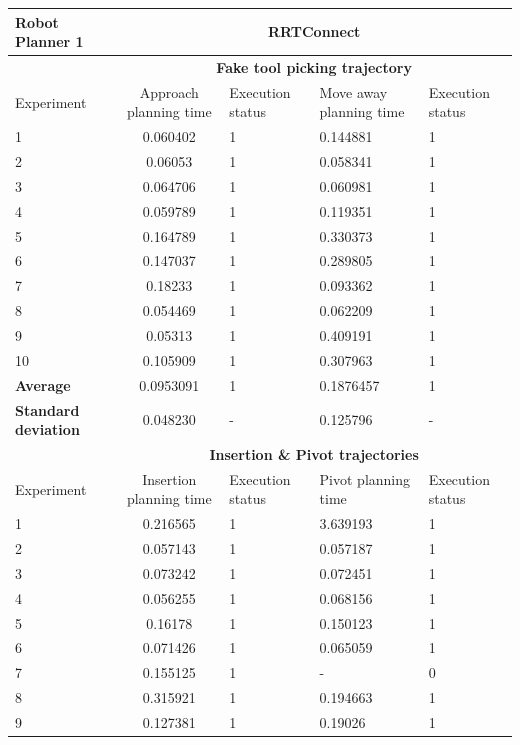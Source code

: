 \begin{longtable}{|p{2cm}|c|p{2cm}|p{2cm}|p{2cm}|}
\hline
Robot Planner 1           & \multicolumn{4}{c}{\textbf{RRTConnect}}                                                                                                 \vline \\
\hline
                          & \multicolumn{4}{c}{\textbf{Fake tool picking trajectory}}                     \vline \\
\hline
Experiment                & Approach planning time & Execution status & Move away planning time & Execution status  \\
\hline
1 &	0.060402 &	1 &	0.144881 &	1 \\
2 &	0.06053 &	1 &	0.058341 &	1 \\
3 &	0.064706 &	1 &	0.060981 &	1 \\
4 &	0.059789 &	1 &	0.119351 &	1 \\
5 &	0.164789 &	1 &	0.330373 &	1 \\
6 &	0.147037 &	1 &	0.289805 &	1 \\
7 &	0.18233 &	1 &	0.093362 &	1 \\
8 &	0.054469 &	1 &	0.062209 &	1 \\
9 &	0.05313 &	1 &	0.409191 &	1 \\
10 &	0.105909 &	1 &	0.307963 &	1 \\
\hline
\textbf{Average} & 	0.0953091 &	1	& 0.1876457	& 1 \\
\hline
\textbf{Standard deviation} & 	0.048230 &	- &	0.125796 & - \\
\hline
                          & \multicolumn{4}{c}{\textbf{Insertion \& Pivot trajectories}}                     \vline \\
\hline
Experiment                & Insertion planning time & Execution status & Pivot planning time & Execution status  \\
\hline
1	& 0.216565	& 1	& 3.639193	& 1 \\
2	& 0.057143	& 1	& 0.057187	& 1 \\
3	& 0.073242	& 1	& 0.072451	& 1 \\
4	& 0.056255	& 1	& 0.068156	& 1 \\
5	& 0.16178	& 1	& 0.150123	& 1 \\
6	& 0.071426	& 1	& 0.065059	& 1 \\
7	& 0.155125	& 1	& -	& 0 \\
8	& 0.315921	& 1	& 0.194663	& 1 \\
9	& 0.127381	& 1	& 0.19026	& 1 \\

\end{longtable}
